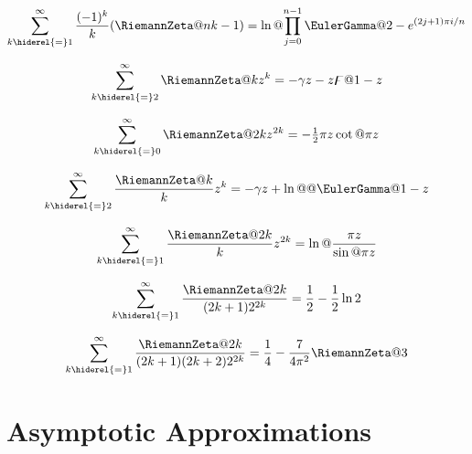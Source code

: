 \documentclass{article}
\begin{document}
\begin{equation}\label{eq:ZE.SUM.SUM4}%
  \sum_{k \hiderel{=} 1}^\infty \frac{\opminus^k}{k} (\RiemannZeta@{nk} - 1)
  = \ln@{\prod_{j=0}^{n-1} \EulerGamma@{2 - \expe^{(2j+1) \cpi \iunit/n}}}
\end{equation}

\begin{equation}\label{eq:ZE.SUM.SUM5}
  \sum_{k \hiderel{=} 2}^\infty \RiemannZeta@{k} z^k
  = - \EulerConstant z - z \digamma@{1-z}
\end{equation}

\begin{equation}\label{eq:ZE.SUM.SUM6}
  \sum_{k \hiderel{=} 0}^\infty \RiemannZeta@{2k} z^{2k}
  = - \tfrac{1}{2} \cpi z \cot@{\cpi z}
\end{equation}

\begin{equation}\label{eq:ZE.SUM.SUM7}
  \sum_{k \hiderel{=} 2}^\infty \frac{\RiemannZeta@{k}}{k} z^k
  = -\EulerConstant z + \ln@@{\EulerGamma@{1-z}}
\end{equation}

\begin{equation}\label{eq:ZE.SUM.SUM8}
  \sum_{k \hiderel{=} 1}^\infty \frac{\RiemannZeta@{2k}}{k} z^{2k}
  = \ln@{\frac{\cpi z}{\sin@{\cpi z}}}
\end{equation}

\begin{equation}\label{eq:ZE.SUM.new9}%
  \sum_{k \hiderel{=} 1}^\infty \frac{\RiemannZeta@{2k}}{(2k+1)2^{2k}}
         = \frac{1}{2} - \frac{1}{2} \ln 2
\end{equation}

\begin{equation}\label{eq:ZE.SUM.SUM9}
  \sum_{k \hiderel{=} 1}^\infty \frac{\RiemannZeta@{2k}}{(2k+1) (2k+2) 2^{2k}}
  = \frac{1}{4} - \frac{7}{4 \cpi^2} \RiemannZeta@{3}
\end{equation}

\section{Asymptotic Approximations}\label{sec:ZE.APP}%

\end{document}
